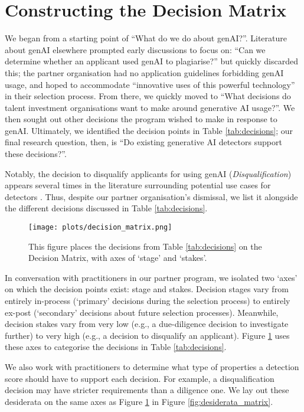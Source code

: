 \section{Constructing the Decision Matrix}\label{ssec:poi}
We began from a starting point of ``What do we do about genAI?''. Literature about genAI elsewhere prompted early discussions to focus on: ``Can we determine whether an applicant used genAI to plagiarise?'' but quickly discarded this; the partner organisation had no application guidelines forbidding genAI usage, and hoped to accommodate ``innovative uses of this powerful technology'' in their selection process. From there, we quickly moved to ``What decisions do talent investment organisations want to make around generative AI usage?''. We then sought out other decisions the program wished to make in response to genAI. Ultimately, we identified the decision points in Table \ref{tab:decisions}; our final research question, then, is ``Do existing generative AI detectors support these decisions?''.

Notably, the decision to disqualify applicants for using genAI (\emph{Disqualification}) appears several times in the literature surrounding potential use cases for detectors \cite{gptzero_gptzero_2023,kalpesh_krishna_paraphrasing_2023}. Thus, despite our partner organisation's dismissal, we list it alongside the different decisions discussed in Table \ref{tab:decisions}.

\begin{figure}[htbp]
  \centering
  \texttt{[image: plots/decision\_matrix.png]}
  \caption{This figure places the decisions from Table \ref{tab:decisions} on the Decision Matrix, with axes of `stage' and `stakes'.}
  \label{fig:decision_matrix}
\end{figure}

In conversation with practitioners in our partner program, we isolated two `axes' on which the decision points exist: stage and stakes. Decision stages vary from entirely in-process (`primary' decisions during the selection process) to entirely ex-post (`secondary' decisions about future selection processes). Meanwhile, decision stakes vary from very low (e.g., a due-diligence decision to investigate further) to very high (e.g., a decision to disqualify an applicant). Figure \ref{fig:decision_matrix} uses these axes to categorise the decisions in Table \ref{tab:decisions}.

We also work with practitioners to determine what type of properties a detection score should have to support each decision. For example, a disqualification decision may have stricter requirements than a diligence one. We lay out these desiderata on the same axes as Figure \ref{fig:decision_matrix} in Figure \ref{fig:desiderata_matrix}. 

